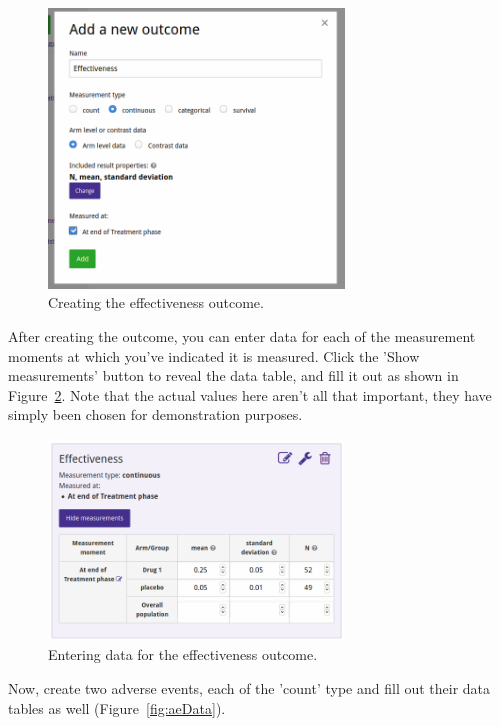 \documentclass[12pt]{article}
\begin{document}
\begin{figure}[!ht]
  \centering
  \includegraphics[width=0.7\textwidth]{img/effectiveness.png}
  \caption{Creating the effectiveness outcome.}
\label{fig:effectiveness}
\end{figure}

After creating the outcome, you can enter data for each of the measurement moments at which you've indicated it is measured.
Click the 'Show measurements' button to reveal the data table, and fill it out as shown in Figure~\ref{fig:measurements}.
Note that the actual values here aren't all that important, they have simply been chosen for demonstration purposes.

\begin{figure}[!ht]
  \centering
  \includegraphics[width=0.7\textwidth]{img/measurements.png}
  \caption{Entering data for the effectiveness outcome.}
\label{fig:measurements}
\end{figure}

Now, create two adverse events, each of the 'count' type and fill out their data tables as well (Figure~\ref{fig:aeData}).
\end{document}
